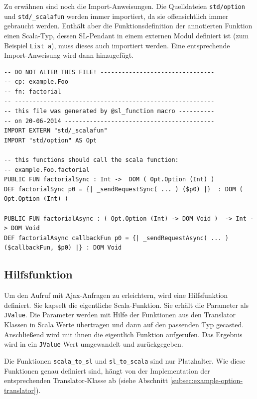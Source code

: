 \documentclass[12pt,bibtotoc]{scrreprt}
\begin{document}
Zu erwähnen sind noch die Import-Anweisungen. Die Quelldateien \lstinline!std/option! und \lstinline!std/_scalafun! werden immer importiert, da sie offensichtlich immer gebraucht werden. Enthält aber die Funktionsdefinition der annotierten Funktion einen Scala-Typ, dessen SL-Pendant in einem externen Modul definiert ist (zum Beispiel \lstinline!List a!), muss dieses auch importiert werden. Eine entsprechende Import-Anweisung wird dann hinzugefügt.

\begin{lstlisting}[caption=SL-Modul factorial.sl zur Funktion aus Listing \ref{lst:example-function}, label=lst:example-sl-modul, float=h]
-- DO NOT ALTER THIS FILE! --------------------------------
-- cp: example.Foo
-- fn: factorial
-- --------------------------------------------------------
-- this file was generated by @sl_function macro ----------
-- on 20-06-2014 ------------------------------------------
IMPORT EXTERN "std/_scalafun"
IMPORT "std/option" AS Opt

-- this functions should call the scala function:
-- example.Foo.factorial
PUBLIC FUN factorialSync : Int ->  DOM ( Opt.Option (Int) )
DEF factorialSync p0 = {| _sendRequestSync( ... ) ($p0) |}  : DOM ( Opt.Option (Int) )

PUBLIC FUN factorialAsync : ( Opt.Option (Int) -> DOM Void )  -> Int -> DOM Void
DEF factorialAsync callbackFun p0 = {| _sendRequestAsync( ... )  ($callbackFun, $p0) |} : DOM Void
\end{lstlisting}

\subsection{Hilfsfunktion}
\label{subsec:helperfunction}

Um den Aufruf mit Ajax-Anfragen zu erleichtern, wird eine Hilfsfunktion definiert. Sie kapselt die eigentliche Scala-Funktion. Sie erhält die Parameter als \lstinline!JValue!. Die Parameter werden mit Hilfe der Funktionen aus den Translator Klassen in Scala Werte übertragen und dann auf den passenden Typ gecasted. Anschließend wird mit ihnen die eigentlich Funktion aufgerufen. Das Ergebnis wird in ein \lstinline!JValue! Wert umgewandelt und zurückgegeben.

Die Funktionen \lstinline!scala_to_sl! und \lstinline!sl_to_scala! sind nur Platzhalter. Wie diese Funktionen genau definiert sind, hängt von der Implementation der entsprechenden Translator-Klasse ab (siehe Abschnitt \ref{subsec:example-option-translator}).
\end{document}
